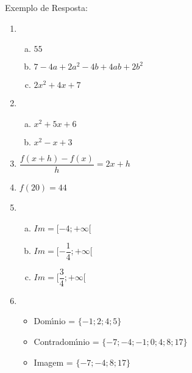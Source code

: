 \\\\

Exemplo de Resposta:
\begin{res}
    \begin{multicols}{2}

        \begin{enumerate}[(1)]

            \item
                \begin{enumerate}[(a)]
                    \item $55$
                    \item $7 - 4 a + 2 a^{2} - 4 b + 4 a b + 2 b^{2}$
                    \item $2x^{2}+4x+7$
                \end{enumerate}

            \item
                \begin{enumerate}[(a)]
                    \item $x^{2}+5x+6$
                    \item $x^{2}-x+3$
                \end{enumerate}

            \item $\dfrac{f\left( x+h\right) -f\left( x\right) }{h}=2x+h$

            \item $f\left( 20\right)=44$

            \item
                \begin{enumerate}[(a)]
                    \item $Im=[-4;+\infty[$
                    \item $Im=[-\dfrac{1}{4};+\infty[$
                    \item $Im=[\dfrac{3}{4};+\infty[$
                \end{enumerate}
            \columnbreak
            \item
                \begin{itemize}
                    \item Dom\'{\i}nio = $\{ -1;2;4;5\}$
                    \item Contradom\'{\i}nio = $\{-7;-4;-1;0;4;8;17\}$
                    \item Imagem = $\{-7;-4;8;17\}$
              \end{itemize}


\end{enumerate}
\end{multicols}
\end{res}
